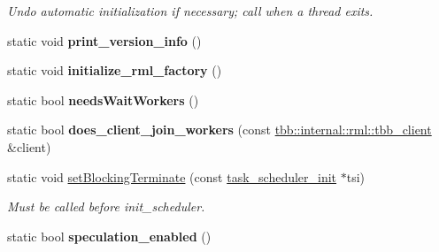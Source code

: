\begin{DoxyCompactItemize}
\begin{DoxyCompactList}\small\item\em Undo automatic initialization if necessary; call when a thread exits. \end{DoxyCompactList}\item 
\hypertarget{classtbb_1_1internal_1_1governor_a4e8e2653fee2983f5be742e3b038c2bf}{}static void {\bfseries print\+\_\+version\+\_\+info} ()\label{classtbb_1_1internal_1_1governor_a4e8e2653fee2983f5be742e3b038c2bf}

\item 
\hypertarget{classtbb_1_1internal_1_1governor_adf4717664956deaf011e3bb939ed2e66}{}static void {\bfseries initialize\+\_\+rml\+\_\+factory} ()\label{classtbb_1_1internal_1_1governor_adf4717664956deaf011e3bb939ed2e66}

\item 
\hypertarget{classtbb_1_1internal_1_1governor_a7ab08454c18a8b08ebed67c0c4cd2a69}{}static bool {\bfseries needs\+Wait\+Workers} ()\label{classtbb_1_1internal_1_1governor_a7ab08454c18a8b08ebed67c0c4cd2a69}

\item 
\hypertarget{classtbb_1_1internal_1_1governor_a43c19dfa41213a92de3da1d0841cbf5a}{}static bool {\bfseries does\+\_\+client\+\_\+join\+\_\+workers} (const \hyperlink{classtbb_1_1internal_1_1rml_1_1tbb__client}{tbb\+::internal\+::rml\+::tbb\+\_\+client} \&client)\label{classtbb_1_1internal_1_1governor_a43c19dfa41213a92de3da1d0841cbf5a}

\item 
\hypertarget{classtbb_1_1internal_1_1governor_a686499843bf07d2bd8e730b3711041cd}{}static void \hyperlink{classtbb_1_1internal_1_1governor_a686499843bf07d2bd8e730b3711041cd}{set\+Blocking\+Terminate} (const \hyperlink{classtbb_1_1task__scheduler__init}{task\+\_\+scheduler\+\_\+init} $\ast$tsi)\label{classtbb_1_1internal_1_1governor_a686499843bf07d2bd8e730b3711041cd}

\begin{DoxyCompactList}\small\item\em Must be called before init\+\_\+scheduler. \end{DoxyCompactList}\item 
\hypertarget{classtbb_1_1internal_1_1governor_a583d8d669aa0be3f3146334dd0385302}{}static bool {\bfseries speculation\+\_\+enabled} ()\label{classtbb_1_1internal_1_1governor_a583d8d669aa0be3f3146334dd0385302}

\end{DoxyCompactItemize}
